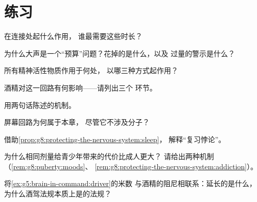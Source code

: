 \section{练习}

\begin{exercise}[$\star$]\label{exo:g8:protecting-the-nervous-system:1}
在连接处起什么作用，
谁最需要这些时长？
\end{exercise}

\begin{exercise}[$\star$]\label{exo:g8:protecting-the-nervous-system:2}
为什么大声是一个“预算”问题？花掉的是什么，以及
过量的警示是什么？
\end{exercise}

\begin{exercise}[$\star$]\label{exo:g8:protecting-the-nervous-system:3}
所有精神活性物质作用于何处，
以哪三种方式起作用？
\end{exercise}

\begin{exercise}[$\star$]\label{exo:g8:protecting-the-nervous-system:4}
酒精对这一回路有何影响——请列出三个
环节。
\end{exercise}

\begin{exercise}[$\star$]\label{exo:g8:protecting-the-nervous-system:5}
用两句话陈述的机制。
\end{exercise}

\begin{exercise}[$\star$]\label{exo:g8:protecting-the-nervous-system:6}
屏幕回路为何属于本章，
尽管它不涉及分子？
\end{exercise}

\begin{exercise}[$\star\star$]\label{exo:g8:protecting-the-nervous-system:7}
借助\cref{prop:g8:protecting-the-nervous-system:sleep}，
解释“复习悖论”。
\end{exercise}

\begin{exercise}[$\star\star$]\label{exo:g8:protecting-the-nervous-system:8}
为什么相同剂量给青少年带来的代价比成人更大？
请给出两种机制
（\cref{rem:g8:puberty:moods}、
\cref{rem:g8:protecting-the-nervous-system:addiction}）。
\end{exercise}

\begin{exercise}[$\star\star$]\label{exo:g8:protecting-the-nervous-system:9}
将\cref{ex:g5:brain-in-command:driver}的米数
与酒精的阻尼相联系：延长的是什么，
为什么酒驾法规本质上是的法规？
\end{exercise}

